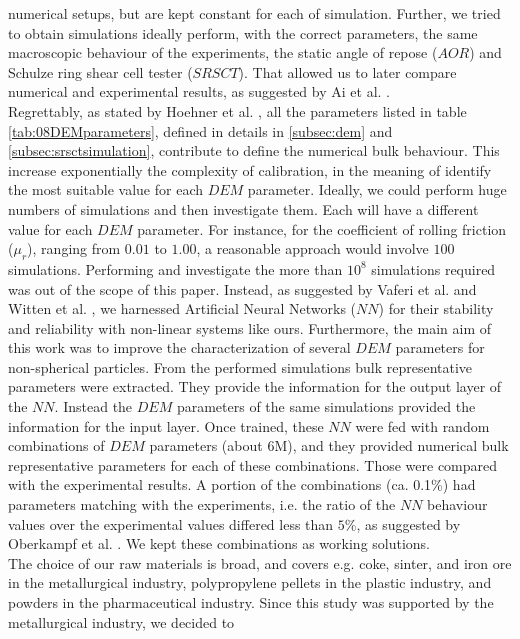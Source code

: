 numerical setups, but are kept constant for each of simulation. 
Further, we tried to obtain simulations ideally perform, with the correct parameters, 
the same macroscopic behaviour of the experiments, the static angle of repose
($AOR$) and Schulze ring shear cell tester ($SRSCT$). That allowed us to later
compare numerical and experimental results, as suggested by Ai et al.
\cite{RefWorks:131}.\\
Regrettably, as stated by Hoehner et al. \cite{RefWorks:86}, all the parameters
listed in table \ref{tab:08DEMparameters}, defined in details in
\ref{subsec:dem} and \ref{subsec:srsctsimulation}, contribute to define the
numerical bulk behaviour.
This increase exponentially the complexity of calibration, in the meaning of 
identify the most suitable value for each $DEM$ parameter.
Ideally, we could perform huge numbers of simulations and then investigate them.
Each will have a different value for each $DEM$ parameter.
For instance, for the coefficient of rolling friction ($\mu_r$), ranging from
$0.01$ to $1.00$, a reasonable approach would involve $100$ simulations.
Performing and investigate the 
more than $10^8$ simulations required was out of the scope of this paper.
Instead, as suggested by Vaferi et al. \cite{RefWorks:150} and Witten et al.
\cite{RefWorks:174}, we harnessed Artificial Neural Networks ($NN$) for their
stability and reliability with non-linear systems like ours.
Furthermore, the main aim of this work was to improve the characterization 
of several $DEM$ parameters for non-spherical particles. 
From the performed simulations bulk representative parameters were extracted. 
They provide the information for the output layer of the $NN$. Instead the $DEM$ 
parameters of the same simulations provided the information for the input layer. 
Once trained, these $NN$ were fed with random combinations of $DEM$ parameters
(about 6M), and they provided numerical bulk representative parameters for each
of these combinations.
Those were compared with the experimental results. A portion of the combinations
(ca. 0.1\%) had parameters matching with the experiments, i.e. the ratio of the $NN$ behaviour
values over the experimental values differed less than $5\%$, as suggested by
Oberkampf et al. \cite{RefWorks:160}.
We kept these combinations as working solutions. \\
The choice of our raw materials is broad, and covers e.g. coke, sinter, and iron
ore in the metallurgical industry, polypropylene pellets in the plastic industry,
and powders in the pharmaceutical industry.
Since this study was supported by the metallurgical industry, we decided to
